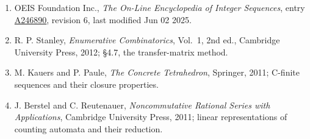\documentclass[11pt]{article}
\theoremstyle{definition}
\begin{document}
\begin{enumerate}

\item OEIS Foundation Inc., \emph{The On-Line Encyclopedia of Integer Sequences}, entry \href{https://oeis.org/A246890}{A246890}, revision 6, last modified Jun 02 2025.

\item R. P. Stanley, \emph{Enumerative Combinatorics}, Vol.~1, 2nd ed., Cambridge University Press, 2012; \S4.7, the transfer-matrix method.

\item M. Kauers and P. Paule, \emph{The Concrete Tetrahedron}, Springer, 2011; C-finite sequences and their closure properties.

\item J. Berstel and C. Reutenauer, \emph{Noncommutative Rational Series with Applications}, Cambridge University Press, 2011; linear representations of counting automata and their reduction.

\end{enumerate}
\end{document}
